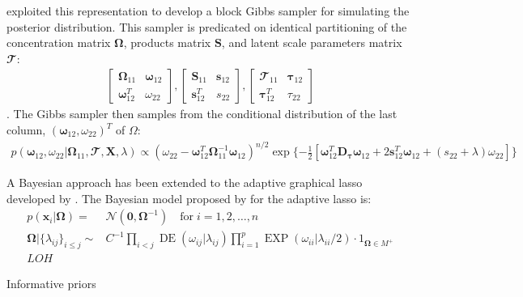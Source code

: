 \documentclass[11pt]{article}
\DeclareMathOperator{\DE}{DE}
\DeclareMathOperator{\EXP}{EXP}
\begin{document}
 exploited this representation to develop a block Gibbs sampler for simulating the posterior distribution. This sampler is predicated on identical partitioning of the concentration matrix $\boldsymbol{\Omega}$, products matrix $\boldsymbol{S}$, and latent scale parameters matrix $\mathbfcal{T}$:
\begin{align}
\begin{bmatrix}
\boldsymbol{\Omega}_{11} & \boldsymbol{\omega}_{12} \\
\boldsymbol{\omega}_{12}^T & \omega_{22}
\end{bmatrix},
\begin{bmatrix}
\mathbf{S}_{11} & \mathbf{s}_{12} \\
\mathbf{s}_{12}^T & s_{22}
\end{bmatrix},
\begin{bmatrix}
\mathbfcal{T}_{11} & \boldsymbol{\tau}_{12} \\
\boldsymbol{\tau}_{12}^T & \tau_{22}
\end{bmatrix}
\end{align}. 
The Gibbs sampler then samples from the conditional distribution of the last column, $(\boldsymbol{\omega}_{12}, \omega_{22})^T$ of $\Omega$:
\begin{align}
p(\boldsymbol{\omega}_{12}, \omega_{22}|\boldsymbol{\Omega}_{11},\mathbfcal{T},\textbf{X},\lambda) \propto \left(\omega_{22}-\boldsymbol{\omega}_{12}^T \boldsymbol{\Omega}_{11}^{-1}\boldsymbol{\omega}_{12} \right)^{n/2} \exp \{ - \frac{1}{2}\left[ \boldsymbol{\omega}_{12}^T \textbf{D}_{\boldsymbol{\tau}} \boldsymbol{\omega}_{12}+ 2 
\textbf{s}_{12}^T \boldsymbol{\omega}_{12} + (s_{22}+\lambda)\omega_{22}\right] \}
\end{align}

A Bayesian approach has been extended to the adaptive graphical lasso developed by \cite{fan2009}. The Bayesian model proposed by \citep{wang2012} for the adaptive lasso is:
\begin{align}
	p(\mathbf{x}_i|\boldsymbol{\Omega}) = & \mathcal{N}(\mathbf{0,\boldsymbol{\Omega}}^{-1}) \quad \text{for} \; i=1,2,\hdots,n\\
		\boldsymbol{\Omega}|\{\lambda_{ij}\}_{i\leq j} \sim & C^{-1} \prod_{i<j} \DE(\omega_{ij}|\lambda_{ij}) \prod_{i=1}^{p} \EXP (\omega_{ii} | \lambda_{ii} / 2) \cdot 1_{\boldsymbol{\Omega}\in M^+}\\
		LOH
\end{align}

Informative priors \citep{peterson2013}
\end{document}
